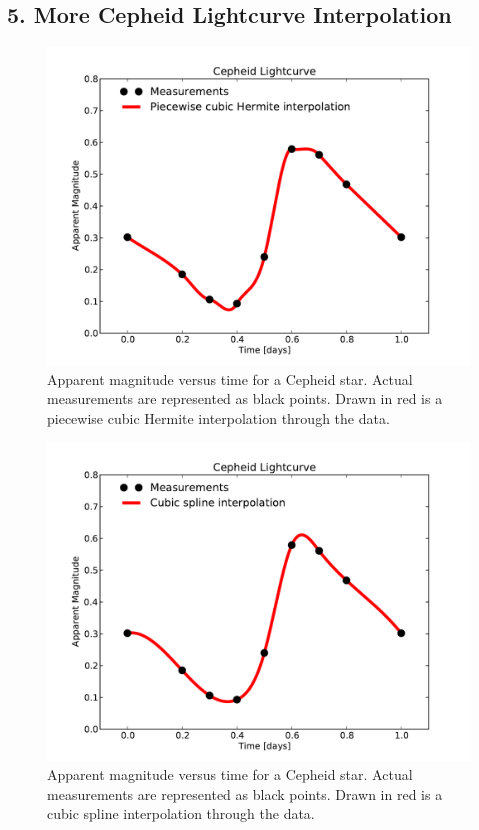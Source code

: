 \documentclass{article}
\begin{document}
\begin{spacing}{1.1}
\subsection{5. More Cepheid Lightcurve Interpolation}

\begin{figure}[H]
 \label{fig5-1}
 \includegraphics[width=\textwidth]{problem5_fig1.pdf}
 \caption{Apparent magnitude versus time for a Cepheid star. Actual measurements are represented as black points. Drawn in red is a piecewise cubic Hermite interpolation through the data.}
\end{figure} 

\begin{figure}[H]
 \label{fig5-2}
 \includegraphics[width=\textwidth]{problem5_fig2.pdf}
 \caption{Apparent magnitude versus time for a Cepheid star. Actual measurements are represented as black points. Drawn in red is a cubic spline interpolation through the data.}
\end{figure} 

\end{spacing}
\end{document}
